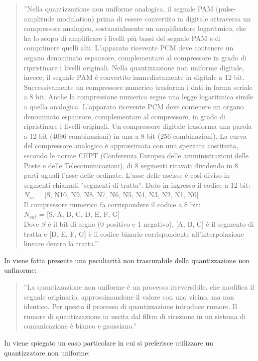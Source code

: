 \documentclass[a4paper]{report} %
\begin{document}
\begin{quote}	
	''Nella quantizzazione non uniforme analogica, il segnale PAM (pulse-amplitude modulation) prima di essere convertito in digitale attraversa un compressore analogico, sostanzialmente un amplificatore logaritmico, che ha lo scopo di amplificare i livelli più bassi del segnale PAM e di comprimere quelli alti. L'apparato ricevente PCM deve contenere un organo denominato espansore, complementare al compressore in grado di ripristinare i livelli originali.
	Nella quantizzazione non uniforme digitale, invece, il segnale PAM è convertito immediatamente in digitale a 12 bit. Successivamente un compressore numerico trasforma i dati in forma seriale a 8 bit. Anche la compressione numerica segue una legge logaritmica simile a quella analogica. L'apparato ricevente PCM deve contenere un organo denominato espansore, complementare al compressore, in grado di ripristinare i livelli originali. Un compressore digitale trasforma una parola a 12 bit (4096 combinazioni) in una a 8 bit (256 combinazioni). La curva del compressore analogico è approssimata con una spezzata costituita, secondo le norme CEPT (Conferenza Europea delle amministrazioni delle Poste e delle Telecomunicazioni), di 8 segmenti ricavati dividendo in 8 parti uguali l'asse delle ordinate. L'asse delle ascisse è così diviso in segmenti chiamati "segmenti di tratta". Dato in ingresso il codice a 12 bit: \\
	$N_{in}$ = [S, N10, N9, N8, N7, N6, N5, N4, N3, N2, N1, N0] \\
	Il compressore numerico fa corrispondere il codice a 8 bit: \\
	$N_{out}$ = [S, A, B, C, D, E, F, G] \\
	Dove $S$ è il bit di segno (0 positivo e 1 negativo), [A, B, C] è il segmento di tratta e [D, E, F, G] è il codice binario corrispondente all'interpolazione lineare dentro la tratta.'' 
\end{quote}
In \cite{art:rif.6} viene fatta presente una peculiarità non trascurabile della quantizzazione non unfinorme:
\begin{quote}
	''La quantizzazione non uniforme è un processo irreversibile, che modifica il segnale originario, approssimandone il valore con uno vicino, ma non identico. Per questo il processo di quantizzazione introduce rumore. Il rumore di quantizzazione in uscita dal filtro di ricezione in un sistema di comunicazione è bianco e gaussiano.'' 
\end{quote}
In \cite{art:rif.7} viene spiegato un caso particolare in cui si preferisce utilizzare un quantizzatore non uniforme:
\end{document}
